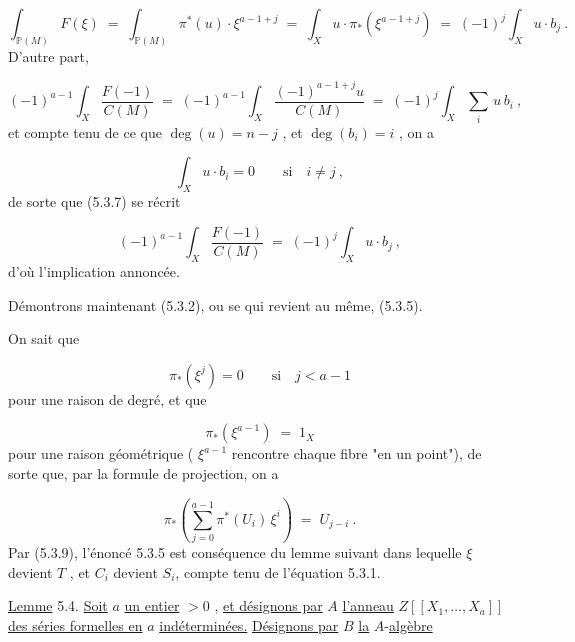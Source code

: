 \begin{equation}\tag{5.3.6}
\int_{\mathbb{P}(M)} F(\xi) \;=\; \int_{\mathbb{P}(M)} \pi^*(u) \cdot \xi^{a-1+j} \;=\; \int_X u \cdot \pi_*(\xi^{a-1+j}) \;=\; (-1)^j \int_X u \cdot b_j \ .
\end{equation}
D'autre part,

\begin{equation}\tag*{5.3.7.}
(-1)^{a-1} \int_X \frac{F(-1)}{C(M)} \;=\; (-1)^{a-1} \int_X \frac{(-1)^{a-1+j}u}{C(M)} \;=\; (-1)^j \int_X \sum_i \, u \, b_i \ ,
\end{equation}
et compte tenu de ce que $\deg(u) = n-j$ , et $\deg(b_i) = i$ , on a

\begin{equation*}
\int_X u \cdot b_i = 0 \qquad \mbox{si} \quad i \neq j \ ,
\end{equation*}
de sorte que (5.3.7) se récrit

\begin{equation}\tag{5.3.8}
(-1)^{a-1} \int_X \frac{F(-1)}{C(M)} \;=\; (-1)^j \int_X u \cdot b_j \ ,
\end{equation}
d'où l'implication annoncée.

Démontrons maintenant (5.3.2), ou se qui revient au même, (5.3.5).



On sait que

\begin{equation*}
\pi_*(\xi^j) = 0 \qquad \mbox{si} \quad j < a-1
\end{equation*}
pour une raison de degré, et que

\begin{equation*}
\pi_*(\xi^{a-1}) \;=\; 1_X
\end{equation*}
pour une raison géométrique ( $\xi^{a-1}$ rencontre chaque fibre "en un point"), de sorte que, par la formule de projection, on a

\begin{equation}\tag{5.3.9}
\pi_*\left( \sum_{j=0}^{a-1} \pi^*(U_i) \, \xi^i \right) \;=\; U_{j-i} \ .
\end{equation}
Par (5.3.9), l'énoncé 5.3.5 est conséquence du lemme suivant  dans lequelle $\xi$ devient $T$ , et $C_i$ devient $S_i$, compte tenu de l'équation 5.3.1.

\underline{Lemme} 5.4. \underline{Soit} $a$ \underline{un entier} $> 0$ , \underline{et désignons par} $A$ \underline{l'anneau} $Z[[X_1,\ldots,X_a]]$ \underline{des séries formelles en} $a$ \underline{indéterminées.} \underline{Désignons par} $B$ \underline{la} $A$-\underline{algèbre}

